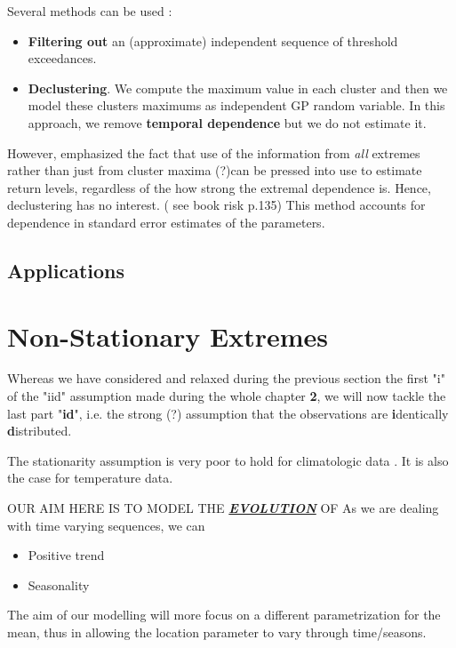 Several methods can be used : 

\begin{itemize}
	\item \textbf{Filtering out} an (approximate) independent sequence of threshold exceedances.
	\item \textbf{Declustering}. We compute the maximum value in each cluster and then we model these clusters maximums as independent GP random variable. In this approach, we remove \textbf{temporal dependence} but we do not estimate it.
	
\end{itemize}


However, \cite{fawcett_estimating_2012} emphasized the fact that use of the information from \textit{all} extremes rather than just from cluster maxima (?)can be pressed into use to estimate return levels, regardless of the how strong the extremal dependence is. Hence, declustering has no interest. ( see book risk p.135)
This method accounts for dependence in standard error estimates of the parameters.


\subsection{Applications}

\section{Non-Stationary Extremes}\label{nstatio}

Whereas we have considered and relaxed during the previous section the first "i" of the "iid" assumption made during the whole chapter \textbf{2}, we will now tackle the last part "\textbf{id}", i.e. the strong (?) assumption that the observations are \textbf{i}dentically \textbf{d}istributed.

The stationarity assumption is very poor to hold for climatologic data \cite{milly_climate_2008}. It is also the case for temperature data.

OUR AIM HERE IS TO MODEL THE \textbf{\textit{\underline{EVOLUTION}}} OF 
As we are dealing with time varying sequences, we can

\begin{itemize}
	\item Positive trend
	\item Seasonality
\end{itemize}

The aim of our modelling will more focus on a different parametrization for the mean, thus in allowing the location parameter to vary through time/seasons.


